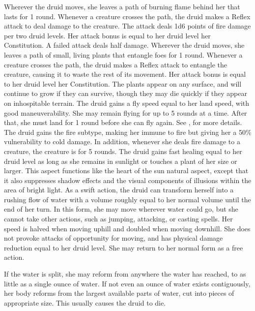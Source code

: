  Wherever the druid moves, she leaves a path of burning flame behind her that lasts for 1 round. Whenever a creature crosses the path, the druid makes a Reflex attack to deal damage to the creature. The attack deals 1d6 points of fire damage per two druid levels. Her attack bonus is equal to her druid level \add her Constitution. A failed attack deals half damage.
 Wherever the druid moves, she leaves a path of small, living plants that entangle foes for 1 round.  Whenever a creature crosses the path, the druid makes a Reflex attack to entangle the creature, causing it to waste the rest of its movement. Her attack bonus is equal to her druid level \add her Constitution. The plants appear on any surface, and will continue to grow if they can survive, though they may die quickly if they appear on inhospitable terrain.
 The druid gains a fly speed equal to her land speed, with good maneuverability. She may remain flying for up to 5 rounds at a time. After that, she must land for 1 round before she can fly again. See , for more details.
 The druid gains the fire subtype, making her immune to fire but giving her a 50\% vulnerability to cold damage. In addition, whenever she deals fire damage to a creature, the creature is \ignited for 5 rounds.
 The druid gains fast healing equal to her druid level as long as she remains in sunlight or touches a plant of her size or larger.
 This aspect functions like the heart of the sun natural aspect, except that it also suppresses shadow effects and the visual components of illusions within the area of bright light. 
 As a swift action, the druid can transform herself into a rushing flow of water with a volume roughly equal to her normal volume until the end of her turn. In this form, she may move wherever water could go, but she cannot take other actions, such as jumping, attacking, or casting spells. Her speed is halved when moving uphill and doubled when moving downhill. She does not provoke attacks of opportunity for moving, and has physical damage reduction equal to her druid level. She may return to her normal form as a free action.
\par If the water is split, she may reform from anywhere the water has reached, to as little as a single ounce of water. If not even an ounce of water exists contiguously, her body reforms from the largest available parts of water, cut into pieces of appropriate size. This usually causes the druid to die.

